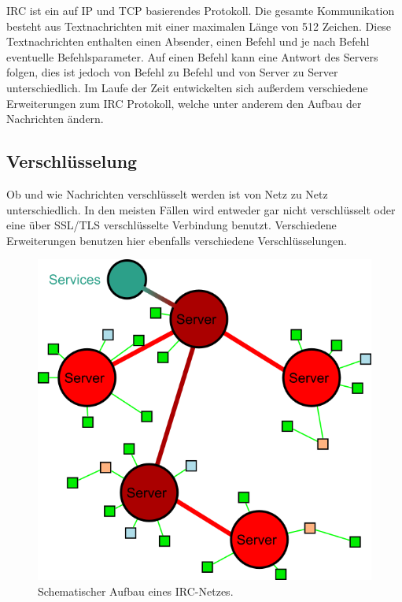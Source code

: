 IRC ist ein auf IP und TCP basierendes Protokoll. Die gesamte Kommunikation besteht aus Textnachrichten mit einer maximalen Länge von 512 Zeichen. Diese Textnachrichten enthalten einen Absender, einen Befehl und je nach Befehl eventuelle Befehlsparameter. Auf einen Befehl kann eine Antwort des Servers folgen, dies ist jedoch von Befehl zu Befehl und von Server zu Server unterschiedlich. Im Laufe der Zeit entwickelten sich außerdem verschiedene Erweiterungen zum IRC Protokoll, welche unter anderem den Aufbau der Nachrichten ändern. 

\subsection{Verschlüsselung}

Ob und wie Nachrichten verschlüsselt werden ist von Netz zu Netz unterschiedlich. In den meisten Fällen wird entweder gar nicht verschlüsselt oder eine über SSL/TLS verschlüsselte Verbindung benutzt. Verschiedene Erweiterungen benutzen hier ebenfalls verschiedene Verschlüsselungen.

\begin{figure}[thb]
\centering
  \includegraphics[width=0.7\linewidth]{Ircnetz.png}
  \caption{Schematischer Aufbau eines IRC-Netzes.}
  \label{abb:Ircnetz}
\end{figure}


